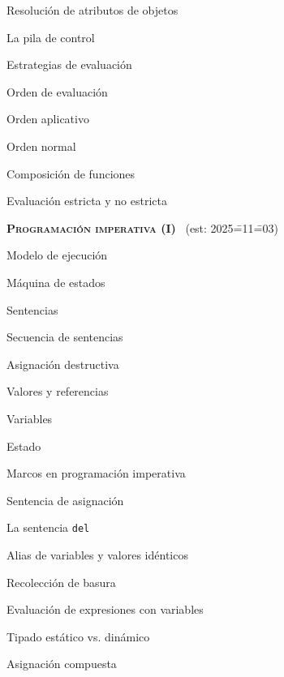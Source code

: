\begin{longenum}
\begin{longenum}
        \item Resolución de atributos de objetos
        \item La pila de control
        \item Estrategias de evaluación \opcional\
        \begin{longenum}
            \item Orden de evaluación
            \begin{longenum}
                \item Orden aplicativo
                \item Orden normal
            \end{longenum}
            \item Composición de funciones
            \item Evaluación estricta y no estricta
        \end{longenum}
    \end{longenum}
    \item \textbf{\textsc{Programación imperativa (I)}} \ev1\ (est: 2025\==11\==03)
    \begin{longenum}
        \item Modelo de ejecución
        \begin{longenum}
            \item Máquina de estados
            \item Sentencias
            \item Secuencia de sentencias
        \end{longenum}
        \item Asignación destructiva
        \begin{longenum}
            \item Valores y referencias
            \item Variables
            \item Estado
            \item Marcos en programación imperativa
            \item Sentencia de asignación
            \item La sentencia \texttt{del}
            \item Alias de variables y valores idénticos
            \item Recolección de basura
            \item Evaluación de expresiones con variables
            \item Tipado estático vs. dinámico
            \item Asignación compuesta

\end{longenum}
\end{longenum}
\end{longenum}
